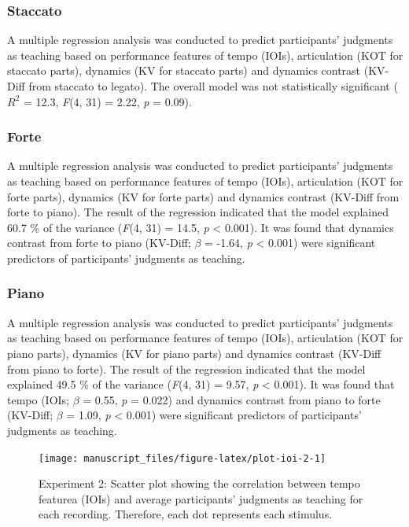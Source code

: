 \documentclass[
  man,floatsintext]{apa6}
\begin{document}
\hypertarget{staccato-1}{%
\subsubsection{Staccato}\label{staccato-1}}

A multiple regression analysis was conducted to predict participants' judgments as teaching based on performance features of tempo (IOIs), articulation (KOT for staccato parts), dynamics (KV for staccato parts) and dynamics contrast (KV-Diff from staccato to legato). The overall model was not statistically significant (\(R^{2}\) = 12.3, \emph{F}(4, 31) = 2.22, \emph{p} = 0.09).

\hypertarget{forte-1}{%
\subsubsection{Forte}\label{forte-1}}

A multiple regression analysis was conducted to predict participants' judgments as teaching based on performance features of tempo (IOIs), articulation (KOT for forte parts), dynamics (KV for forte parts) and dynamics contrast (KV-Diff from forte to piano). The result of the regression indicated that the model explained 60.7 \% of the variance (\emph{F}(4, 31) = 14.5, \emph{p} \textless{} 0.001). It was found that dynamics contrast from forte to piano (KV-Diff; \emph{\(\beta\)} = -1.64, \emph{p} \textless{} 0.001) were significant predictors of participants' judgments as teaching.

\hypertarget{piano-1}{%
\subsubsection{Piano}\label{piano-1}}

A multiple regression analysis was conducted to predict participants' judgments as teaching based on performance features of tempo (IOIs), articulation (KOT for piano parts), dynamics (KV for piano parts) and dynamics contrast (KV-Diff from piano to forte). The result of the regression indicated that the model explained 49.5 \% of the variance (\emph{F}(4, 31) = 9.57, \emph{p} \textless{} 0.001). It was found that tempo (IOIs; \emph{\(\beta\)} = 0.55, \emph{p} = 0.022) and dynamics contrast from piano to forte (KV-Diff; \emph{\(\beta\)} = 1.09, \emph{p} \textless{} 0.001) were significant predictors of participants' judgments as teaching.

\begin{figure}

{\centering \texttt{[image: manuscript\_files/figure-latex/plot-ioi-2-1]} 

}

\caption{\label{fig:ioi-2}Experiment 2: Scatter plot showing the correlation between tempo featurea (IOIs) and average participants' judgments as teaching for each recording. Therefore, each dot represents each stimulus.}\label{fig:plot-ioi-2}
\end{figure}
\end{document}
